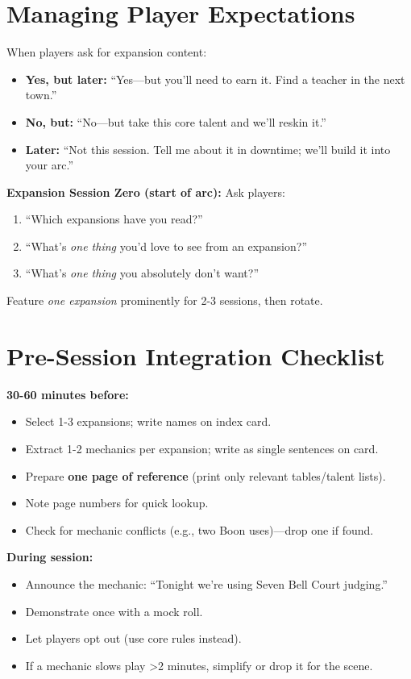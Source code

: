 \section{Managing Player Expectations}
When players ask for expansion content:
\begin{itemize}
  \item \textbf{Yes, but later:} ``Yes---but you'll need to earn it. Find a teacher in the next town.''
  \item \textbf{No, but:} ``No---but take this core talent and we'll reskin it.''
  \item \textbf{Later:} ``Not this session. Tell me about it in downtime; we'll build it into your arc.''
\end{itemize}

\textbf{Expansion Session Zero (start of arc):}
Ask players: 
\begin{enumerate}
  \item ``Which expansions have you read?''
  \item ``What's \textit{one thing} you'd love to see from an expansion?''
  \item ``What's \textit{one thing} you absolutely don't want?''
\end{enumerate}
Feature \textit{one expansion} prominently for 2-3 sessions, then rotate.

\section{Pre-Session Integration Checklist}
\textbf{30-60 minutes before:}
\begin{itemize}
  \item Select 1-3 expansions; write names on index card.
  \item Extract 1-2 mechanics per expansion; write as single sentences on card.
  \item Prepare \textbf{one page of reference} (print only relevant tables/talent lists).
  \item Note page numbers for quick lookup.
  \item Check for mechanic conflicts (e.g., two Boon uses)---drop one if found.
\end{itemize}

\textbf{During session:}
\begin{itemize}
  \item Announce the mechanic: ``Tonight we're using Seven Bell Court judging.''
  \item Demonstrate once with a mock roll.
  \item Let players opt out (use core rules instead).
  \item If a mechanic slows play >2 minutes, simplify or drop it for the scene.
\end{itemize}

